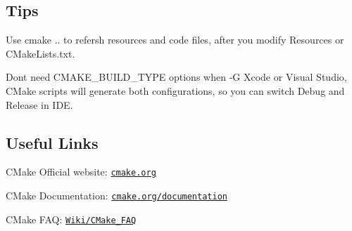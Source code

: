 \subsection*{Tips}


\begin{DoxyEnumerate}
\item Use {\ttfamily cmake ..} to refersh resources and code files, after you modify {\ttfamily Resources} or {\ttfamily C\+Make\+Lists.\+txt}.
\end{DoxyEnumerate}
\begin{DoxyEnumerate}
\item Don\textquotesingle{}t need {\ttfamily C\+M\+A\+K\+E\+\_\+\+B\+U\+I\+L\+D\+\_\+\+T\+Y\+PE} options when {\ttfamily -\/G} Xcode or Visual Studio, C\+Make scripts will generate both configurations, so you can switch {\ttfamily Debug} and {\ttfamily Release} in I\+DE.
\end{DoxyEnumerate}

\subsection*{Useful Links}


\begin{DoxyItemize}
\item C\+Make Official website\+: \href{https://cmake.org/}{\tt cmake.\+org}
\item C\+Make Documentation\+: \href{https://cmake.org/documentation/}{\tt cmake.\+org/documentation}
\item C\+Make F\+AQ\+: \href{https://cmake.org/Wiki/CMake_FAQ}{\tt Wiki/\+C\+Make\+\_\+\+F\+AQ} 
\end{DoxyItemize}